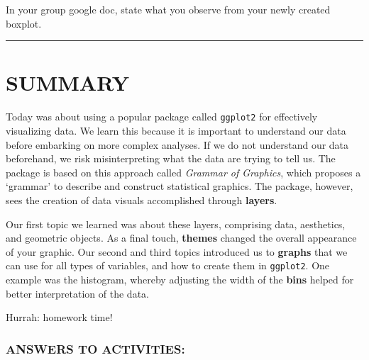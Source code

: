 \documentclass[
]{book}
\begin{document}
In your group google doc, state what you observe from your newly created boxplot.

\begin{center}\rule{0.5\linewidth}{0.5pt}\end{center}

\hypertarget{summary-2}{%
\section{SUMMARY}\label{summary-2}}

Today was about using a popular package called \texttt{ggplot2} for effectively visualizing data. We learn this because it is important to understand our data before embarking on more complex analyses. If we do not understand our data beforehand, we risk misinterpreting what the data are trying to tell us. The package is based on this approach called \emph{Grammar of Graphics}, which proposes a `grammar' to describe and construct statistical graphics. The package, however, sees the creation of data visuals accomplished through \textbf{layers}.

Our first topic we learned was about these layers, comprising data, aesthetics, and geometric objects. As a final touch, \textbf{themes} changed the overall appearance of your graphic. Our second and third topics introduced us to \textbf{graphs} that we can use for all types of variables, and how to create them in \texttt{ggplot2}. One example was the histogram, whereby adjusting the width of the \textbf{bins} helped for better interpretation of the data.

Hurrah: homework time!

\hypertarget{answers-to-activities}{%
\subsubsection{ANSWERS TO ACTIVITIES:}\label{answers-to-activities}}
\end{document}

